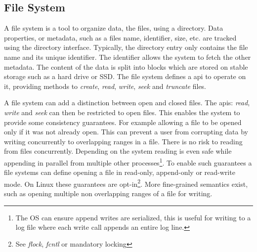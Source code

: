 \subsection{File System}
A file system is a tool to organize data, the files, using a directory. Data properties, or metadata, such as a files name, identifier, size, etc. are tracked using the directory interface. Typically, the directory entry only contains the file name and its unique identifier. The identifier allows the system to fetch the other metadata. The content of the data is split into blocks which are stored on stable storage such as a hard drive or SSD. The file system defines a \ac{api} to operate on it, providing methods to \textit{create}, \textit{read}, \textit{write}, \textit{seek} and \textit{truncate} files. 

A file system can add a distinction between open and closed files. The \acp{api}: \textit{read}, \textit{write} and \textit{seek} can then be restricted to open files. This enables the system to provide some consistency guarantees. For example allowing a file to be opened only if it was not already open. This can prevent a user from corrupting data by writing concurrently to overlapping ranges in a file. There is no risk to reading from files concurrently. Depending on the system reading is even safe while appending in parallel from multiple other processes\footnote{The OS can ensure append writes are serialized, this is useful for writing to a log file where each write call appends an entire log line.}. To enable such guarantees a file systems can define opening a file in read-only, append-only or read-write mode. On Linux these guarantees are opt-in\footnote{See \textsl{flock}, \textsl{fcntl} or mandatory locking}. More fine-grained semantics exist, such as opening multiple non overlapping ranges of a file for writing. 

